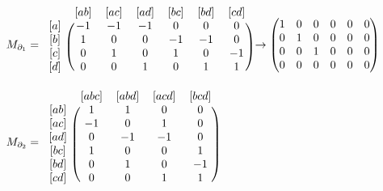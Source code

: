 \begin{example}
\begin{enumerate}
{\begin{align*}
                          M_{\partial_1} & =
                          \begin{blockarray}{ccccccc}
                              & [ab] & [ac] & [ad] & [bc] & [bd] & [cd] \\
                              \begin{block}{c(cccccc)}
                                  {[a]} & -1 & -1 & -1 & 0  & 0  & 0  \\
                                  {[b]} & 1  & 0  & 0  & -1 & -1 & 0  \\
                                  {[c]} & 0  & 1  & 0  & 1  & 0  & -1 \\
                                  {[d]} & 0  & 0  & 1  & 0  & 1  & 1  \\
                              \end{block}
                          \end{blockarray}
                          \to
                          \begin{pmatrix}
                              1 & 0 & 0 & 0 & 0 & 0 \\
                              0 & 1 & 0 & 0 & 0 & 0 \\
                              0 & 0 & 1 & 0 & 0 & 0 \\
                              0 & 0 & 0 & 0 & 0 & 0 \\
                          \end{pmatrix} \\
                          M_{\partial_2} & =
                          \begin{blockarray}{ccccc}
                              & [abc] & [abd] & [acd] & [bcd] \\
                              \begin{block}{c(cccc)}
                                  {[ab]} & 1  & 1  & 0  & 0  \\
                                  {[ac]} & -1 & 0  & 1  & 0  \\
                                  {[ad]} & 0  & -1 & -1 & 0  \\
                                  {[bc]} & 1  & 0  & 0  & 1  \\
                                  {[bd]} & 0  & 1  & 0  & -1 \\
                                  {[cd]} & 0  & 0  & 1  & 1  \\
                              \end{block}

\end{blockarray}
\end{align*}}
\end{enumerate}
\end{example}
